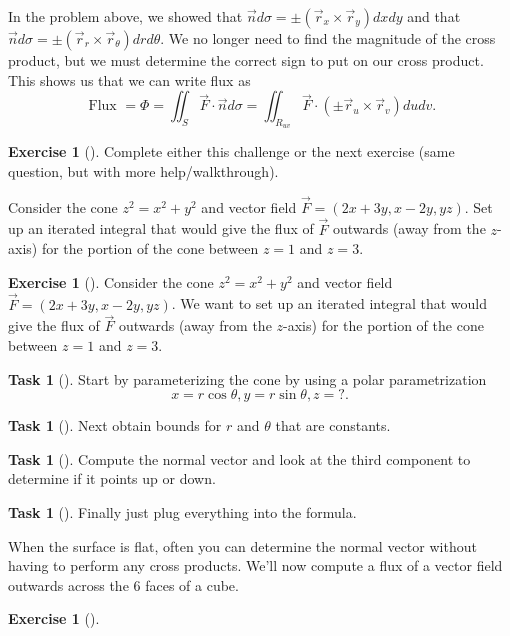 \documentclass[10pt,]{book}
\theoremstyle{plain}
\theoremstyle{definition}
\theoremstyle{definition}
\theoremstyle{definition}
\theoremstyle{definition}
\newtheorem{exploration}[project]{Exercise}
\newtheorem{task}[project]{Task}
\theoremstyle{definition}
\numberwithin{equation}{section}
\begin{document}
In the problem above, we showed that \(\vec n d\sigma = \pm(\vec r_x\times\vec r_y)dxdy\) and that \(\vec n d\sigma = \pm(\vec r_r\times\vec r_\theta)drd\theta\). We no longer need to find the magnitude of the cross product, but we must determine the correct sign to put on our cross product. This shows us that we can write flux as%
\begin{equation*}
\text{ Flux } =\Phi 
= \iint_S \vec F\cdot \vec n d\sigma 
= \iint_{R_{uv}} \vec F\cdot (\pm \vec r_u\times \vec r_v) dudv
.
\end{equation*}
%
\begin{exploration}[]\label{exploration-284}
Complete either this challenge or the next exercise (same question, but with more help/walkthrough).%
\par
Consider the cone \(z^2=x^2+y^2\) and vector field \(\vec F = (2x+3y, x-2y, yz)\). Set up an iterated integral that would give the flux of \(\vec F\) outwards (away from the \(z\)-axis) for the portion of the cone between \(z=1\) and \(z=3\).%
\end{exploration}
\begin{exploration}[]\label{exploration-285}
Consider the cone \(z^2=x^2+y^2\) and vector field \(\vec F = (2x+3y, x-2y, yz)\). We want to set up an iterated integral that would give the flux of \(\vec F\) outwards (away from the \(z\)-axis) for the portion of the cone between \(z=1\) and \(z=3\).%
\begin{task}[]\label{task-772}
Start by  parameterizing the cone by using a polar parametrization%
\begin{equation*}
x=r\cos\theta, y=r\sin\theta, z=?.
\end{equation*}
%
\end{task}
\begin{task}[]\label{task-773}
Next obtain bounds for \(r\) and \(\theta\) that are constants.%
\end{task}
\begin{task}[]\label{task-774}
Compute the normal vector and look at the third component to determine if it points up or down.%
\end{task}
\begin{task}[]\label{task-775}
Finally just plug everything into the formula.%
\end{task}
\end{exploration}
When the surface is flat, often you can determine the normal vector without having to perform any cross products. We'll now compute a flux of a vector field outwards across the 6 faces of a cube.%
\begin{exploration}[]\label{boxflux}
\end{exploration}
\typeout{************************************************}
\typeout{************************************************}
\end{document}

